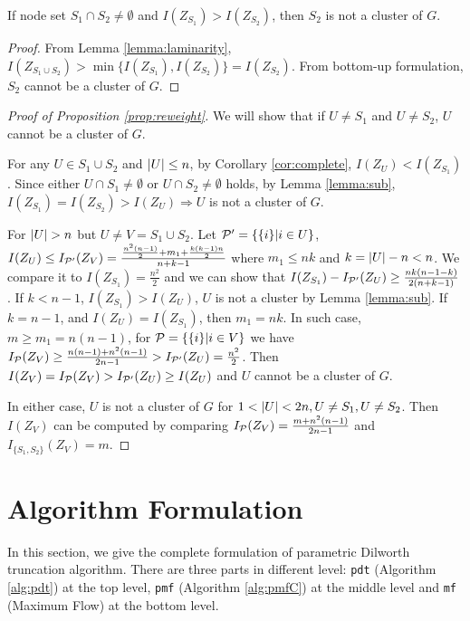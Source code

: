 \documentclass{article}
\begin{document}
\begin{lemma}\label{lemma:sub}
	If node set $S_1 \cap S_2 \neq \emptyset$ and $I(Z_{S_1}) > I(Z_{S_2})$, then $S_2$ is not a cluster of $G$.
\end{lemma}
\begin{proof}
	From Lemma \ref{lemma:laminarity},
	$I(Z_{S_1\cup S_2}) > \min\{I(Z_{S_1}), I(Z_{S_2})\} = I(Z_{S_2})$. From bottom-up formulation,  $S_2$ cannot be a cluster of $G$.
\end{proof}


\begin{proof}[Proof of Proposition \ref{prop:reweight}]
	We will show that if $U \neq S_1$ and $U \neq S_2$, $U$ cannot be a cluster of $G$.
	
For any $U \in S_1 \cup S_2 $ and $\abs{U} \leq n$, by Corollary \ref{cor:complete}, $I(Z_U) < I(Z_{S_1})$.
Since either $U \cap S_1 \neq \emptyset$ or $U \cap S_2 \neq \emptyset$ holds, by Lemma \ref{lemma:sub}, $I(Z_{S_1})= I(Z_{S_2}) > I(Z_U) \Rightarrow U$ is not a cluster of $G$.

For $\abs{U} > n$ but $U \neq V = S_1 \cup S_2$. Let $\P' = \{\{i\}| i\in U\}$, $I(Z_U) \leq I_{\P'}(Z_V) = \frac{\frac{n^2(n-1)}{2} + m_1 + \frac{k(k-1)n}{2}}{n+k-1}$ where $m_1 \leq nk$ and $k=\abs{U} - n < n$. 
We compare it to $I(Z_{S_1}) = \frac{n^2}{2}$ and we can show that $I(Z_{S_1}) - I_{\P'}(Z_U) \geq \frac{nk(n-1-k)}{2(n+k-1)}$. If $k<n-1$, $I(Z_{S_1})>I(Z_U)$, $U$ is not a cluster by Lemma \ref{lemma:sub}. If $k=n-1$, and $I(Z_U) = I(Z_{S_1})$, then $m_1=nk$. In such case, $m\geq m_1=n(n-1)$, for $\P=\{\{i\}|i\in V\}$ we have $I_{\P}(Z_V) \geq \frac{n(n-1)+n^2(n-1)}{2n-1} > I_{\P'}(Z_U)=\frac{n^2}{2}$. Then $I(Z_V) = I_{\P}(Z_V) > I_{\P'}(Z_U) \geq I(Z_U)$ and $U$ cannot be a cluster of $G$.

 In either case, $U$ is not a cluster of $G$ for $1<\abs{U}<2n, U \neq S_1, U\neq S_2$. Then $I(Z_V)$ can be computed by comparing $I_{\P}(Z_V) = \frac{m+n^2(n-1)}{2n-1}$ and $I_{\{S_1, S_2\}}(Z_V)=m$.

\end{proof}

\section{Algorithm Formulation}
In this section, we give the complete formulation of parametric Dilworth truncation algorithm. There are three parts in different level: \texttt{pdt} (Algorithm \ref{alg:pdt}) at the top level, \texttt{pmf} (Algorithm \ref{alg:pmfC}) at the middle level and \texttt{mf} (Maximum Flow) at the bottom level.
\end{document}
